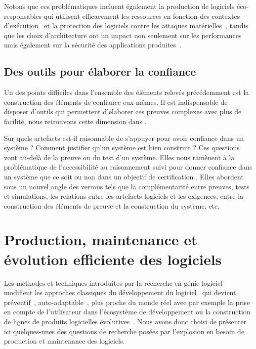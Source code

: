 \documentclass[11pt]{article}
\newcommand{\defi}[1]{\cite[défi]{#1}}
\begin{document}
Notons que ces problématiques incluent également la production de logiciels éco-responsables qui utilisent efficacement les ressources en fonction des contextes d'exécution~\defi{vert} et la protection des logiciels contre les attaques matérielles~\defi{Monniaux}, tandis que les choix d'architecture ont un impact  non seulement sur les performances mais également sur la sécurité des applications produites~\defi{securite}.


\subsection{Des outils pour élaborer la confiance \label{ss:fiabilite:confiance}}
Un des points difficiles dans l'ensemble des éléments relevés précédemment est la construction des éléments de confiance eux-mêmes. Il est indispensable de disposer d'outils qui permettent d'élaborer ces preuves complexes avec plus de facilité, nous retrouvons cette dimension dans \defi{Monniaux, reconfiguration}.  

Sur quels artefacts est-il raisonnable de s'appuyer pour avoir confiance dans un système ? 
Comment justifier qu'un système est bien construit ? Ces questions vont au-delà de la preuve ou du test d'un système. Elles nous ramènent à  la problématique de l'accessibilité au raisonnement suivi pour donner confiance dans un système que ce soit ou non dans un objectif de certification \defi{argumentation}.  Elles abordent sous un nouvel angle des verrous tels que la 
complémentarité entre preuves, tests et simulations, les relations entre les artefacts logiciels et les exigences, entre la construction des éléments de preuve et la construction du système, etc. 
%
\newpage
%
\section{Production, maintenance et évolution efficiente des logiciels \label{s:maintenance}}
Les méthodes et techniques introduites par la recherche en génie logiciel modifient les approches classiques du développement du logiciel~\cite{Broy18} qui devient préventif~\cite{Hamilton18}, auto-adaptable~\cite{Chandra2020, murphy19}, plus proche du monde réel avec par exemple la prise en compte de l’utilisateur dans l’écosystème de développement ou la construction de lignes de produits logicielles évolutives~\cite{Marques2019}. Nous avons donc choisi de présenter ici quelques-unes des questions de recherche posées par l'explosion en besoin de production et maintenance des logiciels.
\end{document}
